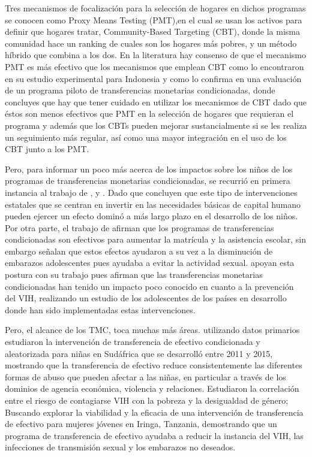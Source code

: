 \documentclass[AER]{AEA}
\begin{document}
Tres mecanismos de focalización para la selección de hogares en dichos programas se conocen como Proxy Means Testing (PMT),en el cual se usan los activos para definir que hogares tratar, Community-Based Targeting (CBT), donde la misma comunidad hace un ranking de cuales son los hogares más pobres, y un método híbrido que combina a los dos. En la literatura hay consenso de que el mecanismo PMT es más efectivo que los mecanismos que emplean CBT como lo encontraron \cite{Alatas2012TargetingIndonesia} en su estudio experimental para Indonesia y como lo confirma \cite{Stoeffler2016ReachingCameroon} en una evaluación de un programa piloto de transferencias monetarias condicionadas, donde concluyes que hay que tener cuidado en utilizar los mecanismos de CBT dado que éstos son menos efectivos que PMT en la selección de hogares que requieran el programa y además que los CBTs pueden mejorar sustancialmente si se les realiza un seguimiento más regular, así como una mayor integración en el uso de los CBT junto a los PMT. 

Pero, para informar un poco más acerca de los impactos sobre los niños de los programas de transferencias monetarias condicionadas, se recurrió en primera instancia al trabajo de \citep{Ozer2009EffectsProblems}, \citep{Baird2010TheWomen} y \citep{Pettifor2012CanPrevention}. Dado que \cite{Ozer2009EffectsProblems} concluyen que este tipo de intervenciones estatales que se centran en invertir en las necesidades básicas de capital humano pueden ejercer un efecto dominó a más largo plazo en el desarrollo de los niños. Por otra parte, el trabajo de \cite{Baird2010TheWomen} afirman que los programas de transferencias condicionadas son efectivos para aumentar la matrícula y la asistencia escolar, sin embargo señalan que estos efectos ayudaron a su vez a la disminución de embarazos adolescentes pues ayudaba a evitar la actividad sexual. \cite{Pettifor2012CanPrevention} apoyan esta postura con su trabajo pues afirman que las transferencias monetarias condicionadas han tenido un impacto poco conocido en cuanto a  la prevención del VIH, realizando un estudio de los adolescentes de los países en desarrollo donde han sido implementadas estas intervenciones.

Pero, el alcance de los TMC, toca muchas más áreas. \cite{Kilburn2020The068} utilizando datos primarios estudiaron la intervención de transferencia de efectivo condicionada y aleatorizada para niñas en Sudáfrica que se desarrolló entre 2011 y 2015, mostrando que la transferencia de efectivo reduce consistentemente las diferentes formas de abuso que pueden afectar  a las niñas, en particular a través de los dominios de agencia económica, violencia y relaciones. \cite{Kennedy2014ExploringTanzania} Estudiaron la correlación entre el riesgo de contagiarse VIH con la pobreza y la desigualdad de género; Buscando explorar la viabilidad y la eficacia de una intervención de transferencia de efectivo para mujeres jóvenes en Iringa, Tanzania, demostrando que un programa de transferencia de efectivo ayudaba a reducir la instancia del VIH, las infecciones de transmisión sexual y los embarazos no deseados. 
 
\end{document}
